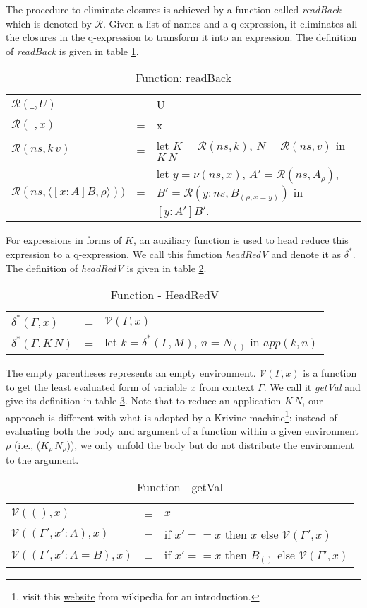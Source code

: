 The procedure to eliminate closures is achieved by a function called \emph{readBack} which is denoted by $\mathcal{R}$. Given a list of names and a q-expression, it eliminates all the closures in the q-expression to transform it into an expression. The definition of \emph{readBack} is given in table \ref{theory:tab:readBack}.
\begin{table}[h] 
  \centering
  \begin{tabular}{l l p{8cm}}
    $\mathcal{R}(\_, U)$ & = & U \\
    $\mathcal{R}(\_, x)$ & = & x \\
    $\mathcal{R}(ns, k\,v)$ & = & let $K = \mathcal{R}(ns, k)$, $N = \mathcal{R}(ns, v)$ in $K\,N$ \\
    $\mathcal{R}(ns, \langle [x : A] B, \rho \rangle))$ & = & let $y = \nu(ns, x)$, $A' = \mathcal{R}(ns, A_\rho)$, $B' = \mathcal{R}(y:ns, B_{(\rho, x=y)})$ in $[y : A'] B'$.
  \end{tabular}
  \caption{Function: readBack}
  \label{theory:tab:readBack}
\end{table}

For expressions in forms of $K$, an auxiliary function is used to head reduce this expression to a q-expression. We call this function \emph{headRedV} and denote it as $\delta^*$. The definition of \emph{headRedV} is given in table \ref{theory:tab:headRedV}.
\begin{table}[h]
  \centering
  \begin{tabular}{l l p{8cm}}
    $\delta^*(\Gamma, x)$ & = & $\mathcal{V}(\Gamma, x)$ \\
    $\delta^*(\Gamma, K\,N)$ & = & let $k = \delta^*(\Gamma, M)$, $n = N_{()}$ in $app(k,n)$
  \end{tabular}
  \caption{Function - HeadRedV}
  \label{theory:tab:headRedV}
\end{table}

The empty parentheses represents an empty environment. $\mathcal{V}(\Gamma, x)$ is a function to get the least evaluated form of variable $x$ from context $\Gamma$. We call it \emph{getVal} and give its definition in table \ref{theory:tab:getVal}. Note that to reduce an application $K\,N$, our approach is different with what is adopted by a Krivine machine\footnote{visit this \href{https://en.wikipedia.org/wiki/Krivine_machine}{website} from wikipedia for an introduction.}: instead of evaluating both the body and argument of a function within a given environment $\rho$ (i.e., ($K_\rho\,N_\rho$)), we only unfold the body but do not distribute the environment to the argument. 
\begin{table}[h]
  \centering
  \begin{tabular}{l l l}
    $\mathcal{V}((), x)$ & = & $x$ \\
    $\mathcal{V}((\Gamma', x' : A), x)$ & = & if $x' == x$ then $x$ else $\mathcal{V}(\Gamma', x)$ \\
    $\mathcal{V}((\Gamma', x' : A = B), x)$ & = & if $x' == x$ then $B_{()}$ else $\mathcal{V}(\Gamma', x)$
  \end{tabular}
  \caption{Function - getVal}
  \label{theory:tab:getVal}
\end{table}

